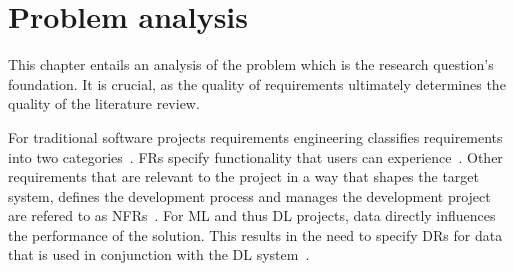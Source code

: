 \chapter{Problem analysis}\label{ch:problem}
This chapter entails an analysis of the problem which is the research question's foundation.
It is crucial, as the quality of requirements ultimately determines the quality of the literature
review.

For traditional software projects requirements engineering classifies requirements into
two categories~\cite{zowghi_requirements_2014}.
\Acp{FR} specify functionality that users can experience~\cite{noauthor_ieee_1998}.
Other requirements that are relevant to the project in a way that shapes the target system,
defines the development process and manages the development project are refered to as
\acp{NFR}~\cite{kotonya_requirements_1998,chung_non-functional_2009}.
For \ac{ML} and thus \ac{DL} projects, data directly influences the performance of the solution.
This results in the need to specify \acp{DR} for data that is used
in conjunction with the \ac{DL} system~\cite{vogelsang_requirements_2019}.



